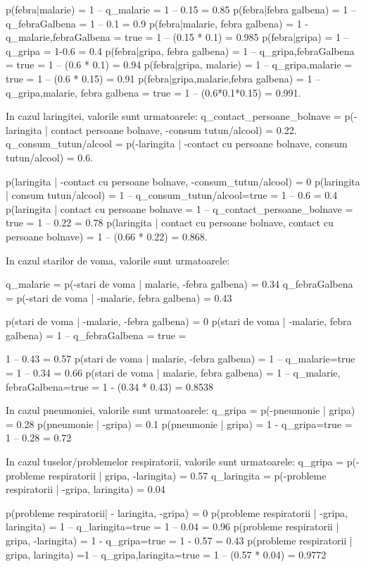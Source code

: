 p(febra|malarie) = 1 – q_malarie = 1 – 0.15 = 0.85  
p(febra|febra galbena) = 1 – q_febraGalbena = 1 – 0.1 = 0.9
p(febra|malarie, febra galbena) = 1   - q_malarie,febraGalbena =
 true = 1 – (0.15 * 0.1) = 0.985
p(febra|gripa) = 1 – q_gripa = 1-0.6 = 0.4
p(febra|gripa, febra galbena) = 1 – q_gripa,febraGalbena =
 true = 1 – (0.6 * 0.1) = 0.94
p(febra|gripa, malarie) = 1 – q_gripa,malarie = true   =
 1 – (0.6 * 0.15) = 0.91
p(febra|gripa,malarie,febra galbena) = 1 – q_gripa,malarie,
febra galbena = true = 1 – (0.6*0.1*0.15) = 0.991.

In cazul laringitei, valorile sunt urmatoarele:
q_contact_persoane_bolnave = p(-laringita |
 contact persoane bolnave, -consum tutun/alcool) = 0.22.
q_consum_tutun/alcool = p(-laringita | -contact cu persoane bolnave,
 consum tutun/alcool) = 0.6.

p(laringita | -contact cu persoane bolnave, -consum_tutun/alcool) = 0
p(laringita | consum tutun/alcool) = 1 – q_consum_tutun/alcool=true    = 
 1 – 0.6 = 0.4
p(laringita | contact cu persoane bolnave = 1 – q_contact_persoane_bolnave =
 true   =   1 – 0.22 = 0.78
p(laringita | contact cu persoane bolnave, contact cu persoane bolnave) =
 1 – (0.66 * 0.22) = 0.868.

In cazul starilor de voma, valorile sunt urmatoarele:

q_malarie = p(-stari de voma | malarie, -febra galbena) = 0.34
q_febraGalbena = p(-stari de voma | -malarie, febra galbena) = 0.43

p(stari de voma | -malarie, -febra galbena) = 0
p(stari de voma | -malarie, febra galbena) = 1 – q_febraGalbena = true   =

  1 – 0.43 = 0.57
p(stari de voma | malarie, -febra galbena) = 1 – q_malarie=true   = 1 – 0.34 = 0.66
p(stari de voma | malarie, febra galbena)  = 1 – q_malarie, febraGalbena=true  = 
1  - (0.34 * 0.43) = 0.8538


 In cazul pneumoniei, valorile sunt urmatoarele:
q_gripa = p(-pneumonie | gripa) = 0.28
p(pneumonie | -gripa) = 0.1
p(pneumonie | gripa) = 1  - q_gripa=true   = 1 – 0.28  = 0.72


In cazul tuselor/problemelor respiratorii, valorile sunt urmatoarele:
q_gripa = p(-probleme respiratorii | gripa, -laringita)  = 0.57
q_laringita = p(-probleme respiratorii | -gripa, laringita) = 0.04

p(probleme respiratorii| - laringita, -gripa) = 0
p(probleme respiratorii | -gripa, laringita) = 1 – q_laringita=true  =
 1 – 0.04 = 0.96
p(probleme respiratorii | gripa, -laringita) = 1  - q_gripa=true =
 1 -  0.57 = 0.43
p(probleme respiratorii | gripa, laringita) =1 – q_gripa,laringita=true  = 
1 – (0.57 * 0.04) = 0.9772

